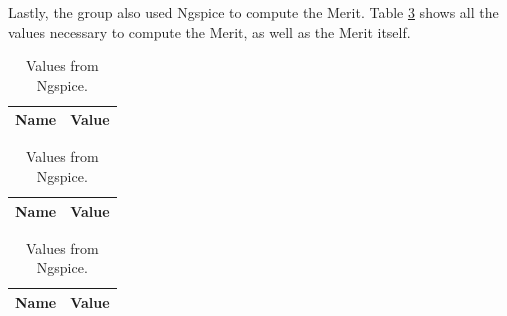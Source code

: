 Lastly, the group also used Ngspice to compute the Merit. Table \ref{tab:merit} shows all the 
values necessary to compute the Merit, as well as the Merit itself.

\begin{table}[h]
	\centering
	\begin{tabular}{|l|r|}
		\hline    
		{\bf Name} & {\bf Value} \\ \hline
    		
	\end{tabular}
	
	\caption{Values from Ngspice.}
    
\label{tab:op_sim}
\end{table}

\begin{table}[h]
	\centering
	\begin{tabular}{|l|r|}
		\hline    
		{\bf Name} & {\bf Value} \\ \hline
    		
    		
	\end{tabular}
	
	\caption{Values from Ngspice.}
    
\label{tab:imp_sim}
\end{table}

\begin{table}[h]
	\centering
	\begin{tabular}{|l|r|}
		\hline    
		{\bf Name} & {\bf Value} \\ \hline
    		
	\end{tabular}
	
	\caption{Values from Ngspice.}
    
\label{tab:merit}
\end{table}


